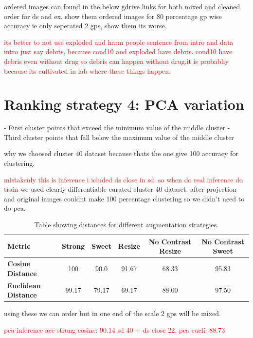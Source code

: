 ordered images can found in the below gdrive links for both mixed and cleaned order for ds and ex.
show them ordered images for 80 percentage gp wise accuracy ie only seperated 2 gps, show them its worse.

\textcolor{red}{its better to not use exploded and harm people sentence from intro and data intro just say debris, because cond10 and exploded have debris. cond10 
have debris even without drug so debris can happen without drug.it is probabliy because its cultivated in lab where these things happen.} 

\section{ Ranking strategy 4: PCA variation}

- First cluster points that exceed the minimum value of the middle cluster
- Third cluster points that fall below the maximum value of the middle cluster

why we choosed cluster 40 dataset because thats the one give 100 accuracy for clustering.

\textcolor{red}{mistakenly this is inference i  icluded ds close in sd. so when do real inference do train}
we used clearly differentiable curated cluster 40 dataset. after projection and original iamges couldnt make 100 percentage clustering so we didn't need to do pca.
\begin{table}[H]
    \centering
    \begin{tabular}{@{}lccccc@{}}
    \toprule
    \textbf{Metric}          & \textbf{Strong} & \textbf{Sweet} & \textbf{Resize} & \textbf{No Contrast Resize} & \textbf{No Contrast Sweet} \\ \midrule
    \textbf{Cosine Distance} & 100               & 90.0              & 91.67               & 68.33                           & 95.83                          \\
    \textbf{Euclidean Distance} & 99.17           & 79.17              & 69.17               & 88.00                           & 97.50                          \\ \bottomrule
    \end{tabular}
    \caption{Table showing distances for different augmentation strategies.}
    \label{tab:distances}
  \end{table}

using these we can order but in one end of the scale 2 gps will be mixed.


\textcolor{red}{pca inference acc strong cosine: 90.14 sd 40 + ds close 22. pca eucli: 88.73}


